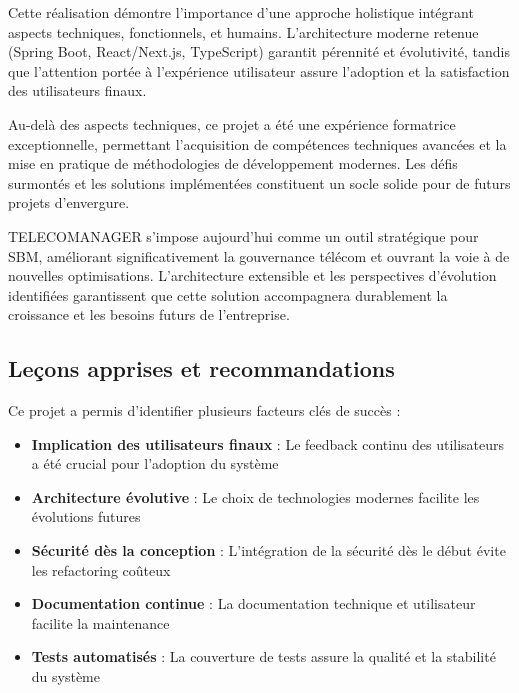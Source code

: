 \documentclass[12pt,a4paper]{report}
\begin{document}
Cette réalisation démontre l'importance d'une approche holistique intégrant aspects techniques, fonctionnels, et humains. L'architecture moderne retenue (Spring Boot, React/Next.js, TypeScript) garantit pérennité et évolutivité, tandis que l'attention portée à l'expérience utilisateur assure l'adoption et la satisfaction des utilisateurs finaux.

Au-delà des aspects techniques, ce projet a été une expérience formatrice exceptionnelle, permettant l'acquisition de compétences techniques avancées et la mise en pratique de méthodologies de développement modernes. Les défis surmontés et les solutions implémentées constituent un socle solide pour de futurs projets d'envergure.

TELECOMANAGER s'impose aujourd'hui comme un outil stratégique pour SBM, améliorant significativement la gouvernance télécom et ouvrant la voie à de nouvelles optimisations. L'architecture extensible et les perspectives d'évolution identifiées garantissent que cette solution accompagnera durablement la croissance et les besoins futurs de l'entreprise.


\subsection{Leçons apprises et recommandations}
Ce projet a permis d'identifier plusieurs facteurs clés de succès :

\begin{itemize}
\item \textbf{Implication des utilisateurs finaux} : Le feedback continu des utilisateurs a été crucial pour l'adoption du système
\item \textbf{Architecture évolutive} : Le choix de technologies modernes facilite les évolutions futures
\item \textbf{Sécurité dès la conception} : L'intégration de la sécurité dès le début évite les refactoring coûteux
\item \textbf{Documentation continue} : La documentation technique et utilisateur facilite la maintenance
\item \textbf{Tests automatisés} : La couverture de tests assure la qualité et la stabilité du système
\end{itemize}
\end{document}
